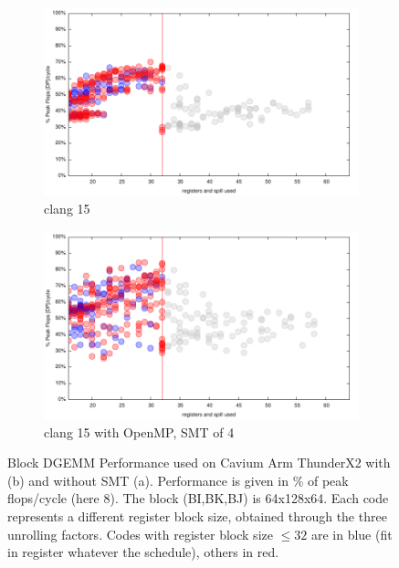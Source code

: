 \documentclass{article}
\begin{document}
\begin{figure}[h!]
  \begin{subfigure}[h]{0.45\textwidth}
  \includegraphics[width=\textwidth]{../benches/gemm/arm-64x256x64/greedy.pdf}
  \caption{clang 15}
  \end{subfigure}
  \begin{subfigure}[h]{0.45\textwidth}  
\includegraphics[width=\textwidth]{../benches/gemm/arm-64x256x64/openmp.pdf}
  \caption{clang 15 with OpenMP, SMT of 4}
  \end{subfigure}
    \caption{Block DGEMM Performance used on Cavium Arm ThunderX2 with (b) and without SMT (a). Performance is given in \% of peak flops/cycle (here 8). The block (BI,BK,BJ) is 64x128x64. Each code represents a different register block size, obtained through the three unrolling factors. Codes with register block size $\leq 32$ are in blue (fit in register whatever the schedule), others in red. \label{fig:arm}}
\end{figure}
\end{document}
